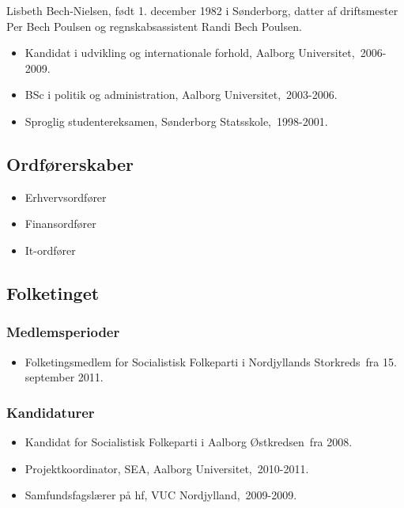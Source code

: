 \documentclass[11pt, a4paper]{awesome-cv}
\begin{document}
\makecvheader[R]
\makelettertitle
\begin{cvletter}
Lisbeth Bech-Nielsen, født 1. december 1982 i Sønderborg, datter af driftsmester Per Bech Poulsen og regnskabsassistent Randi Bech Poulsen.

\begin{itemize}
\item Kandidat i udvikling og internationale forhold, Aalborg Universitet, 2006-2009.
\item BSc i politik og administration, Aalborg Universitet, 2003-2006.
\item Sproglig studentereksamen, Sønderborg Statsskole, 1998-2001.
\end{itemize}
\subsection*{Ordførerskaber}
\begin{itemize}
\item Erhvervsordfører
\item Finansordfører
\item It-ordfører
\end{itemize}
\subsection*{Folketinget}
\subsubsection*{Medlemsperioder}
\begin{itemize}
\item Folketingsmedlem for Socialistisk Folkeparti i Nordjyllands Storkreds fra 15. september 2011.
\end{itemize}
\subsubsection*{Kandidaturer}
\begin{itemize}
\item Kandidat for Socialistisk Folkeparti i Aalborg Østkredsen fra 2008.
\end{itemize}
\begin{itemize}
\item Projektkoordinator, SEA, Aalborg Universitet, 2010-2011.
\item Samfundsfagslærer på hf, VUC Nordjylland, 2009-2009.
\end{itemize}
\end{cvletter}
\end{document}
